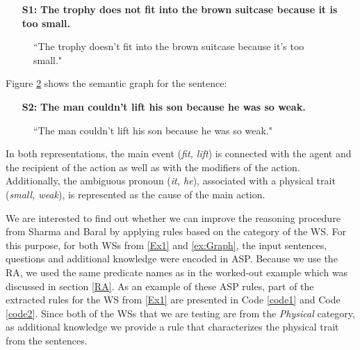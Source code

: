 \begin{itemize}
	\item[\textbf{S1:}] \textbf{The trophy does not fit into the brown suitcase because it is too small.}
\end{itemize}
\begin{figure} [h!]
	\centering
	
	\caption{\label{Graph1}``The trophy doesn't fit into the brown suitcase because it's too small."}
\end{figure}

Figure \ref{Graph2} shows the semantic graph for the sentence:

\begin{itemize}
	\item[\textbf{S2:}] \textbf{The man couldn't lift his son because he was so weak.}
\end{itemize} 


\begin{figure}[h!]
	\centering
	
	\caption{\label{Graph2}``The man couldn't lift his son because he was so weak."}
\end{figure}

In both representations, the main event (\textit{fit, lift}) is connected with the agent and the recipient of the action as well as with the modifiers of the action. Additionally, the ambiguous pronoun (\textit{it, he}),  associated with a physical trait (\textit{small, weak}), is represented as the cause of the main action. 

We are interested to find out whether we can improve the reasoning procedure from Sharma and Baral \cite{2018CommonsenseKT} 
by applying rules based on the category of the WS. 
For this purpose, for both WSs from  \ref{Ex1} and \ref{ex:Graph}, the input sentences, questions and additional knowledge were encoded in ASP. Because we use the RA, we used the same predicate names as in the worked-out example which was discussed in section \ref{RA}. As an example of these ASP rules, part of the extracted rules for the WS from \ref{Ex1} are presented in Code \ref{code1} and  Code \ref{code2}. 
Since both of the WSs that we are testing are from the \textit{Physical} category, as additional knowledge we provide a rule that characterizes the physical trait from the sentences. 


